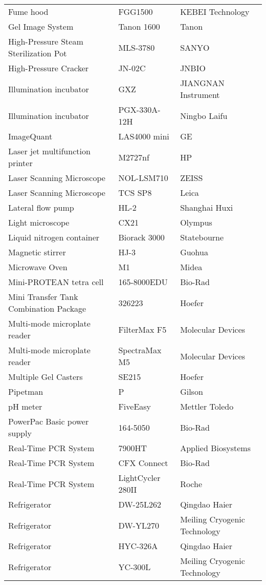 \begin{longtable}{lll @{}}
Fume hood	&	FGG1500	&	KEBEI Technology	\\
Gel Image System	&	Tanon 1600	&	Tanon	\\
High-Pressure Steam Sterilization Pot	&	MLS-3780	&	SANYO	\\
High-Pressure Cracker & JN-02C & JNBIO \\
Illumination incubator	&	GXZ	&	JIANGNAN Instrument	\\
Illumination incubator	&	PGX-330A-12H	&	Ningbo Laifu	\\
ImageQuant & LAS4000 mini & GE\\
Laser jet multifunction printer	&	M2727nf	&	HP	\\
Laser Scanning Microscope & NOL-LSM710 & ZEISS \\
Laser Scanning Microscope & TCS SP8 & Leica \\
Lateral flow pump	&	HL-2	&	Shanghai Huxi	\\
Light microscope	&	CX21	&	Olympus	\\
Liquid nitrogen container	&	Biorack 3000	&	Statebourne	\\
Magnetic stirrer	&	HJ-3	&	Guohua	\\
Microwave Oven & M1 & Midea \\
Mini-PROTEAN tetra cell	&	165-8000EDU	&	Bio-Rad	\\
Mini Transfer Tank Combination Package	&	326223	&	Hoefer	\\
Multi-mode microplate reader	&	FilterMax F5	&	Molecular Devices	\\
Multi-mode microplate reader    &   SpectraMax M5   &   Molecular Devices   \\
Multiple Gel Casters	&	SE215	&	Hoefer	\\
Pipetman    &   P & Gilson \\
pH meter	&	FiveEasy	&	Mettler Toledo	\\
PowerPac Basic power supply	&	164-5050	&	Bio-Rad	\\
Real-Time PCR System & 7900HT & Applied Biosystems \\
Real-Time PCR System & CFX Connect & Bio-Rad\\
Real-Time PCR System & LightCycler 280II & Roche  \\
Refrigerator	&	DW-25L262	&	Qingdao Haier	\\
Refrigerator	&	DW-YL270	&	Meiling Cryogenic Technology	\\
Refrigerator	&	HYC-326A	&	Qingdao Haier	\\
Refrigerator	&	YC-300L	&	Meiling Cryogenic Technology	\\

\end{longtable}
